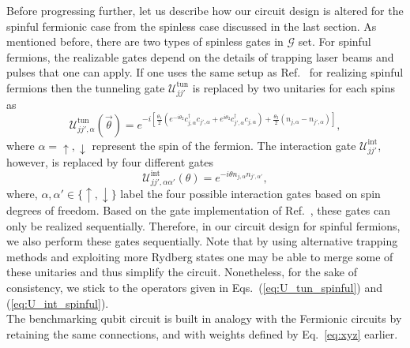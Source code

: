 \documentclass[aps, prx, reprint, superscriptaddress]{revtex4-2}
\begin{document}
Before progressing further, let us describe how our circuit design is altered for the spinful fermionic case from the spinless case discussed in the last section. As mentioned before, there are two types of spinless gates in $\mathcal{G}$ set. For spinful fermions, the realizable gates depend on the details of trapping laser beams and pulses that one can apply. If one uses the same setup as Ref.~\cite{gonzalez2023fermionic} for realizing spinful fermions then the tunneling gate $\mathcal{U}_{jj'}^{\text{tun}}$ is replaced by two unitaries for each spins as
\begin{equation} \label{eq:U_tun_spinful}
\mathcal{U}_{jj',\alpha}^{\text{tun}}(\vec{\theta}) = e^{-i \left[ \frac{\theta_1}{2}\left( e^{-i\theta_2} c_{j,\alpha}^{\dagger} c_{j',\alpha}+ e^{i\theta_2} c_{j',\alpha}^{\dagger} c_{j,\alpha} \right) + \frac{\theta_3}{2} (n_{j,\alpha} - n_{j',\alpha}) \right]},
\end{equation}
where $\alpha{=}\uparrow{,} \downarrow$ represent the spin of the fermion. The interaction gate $\mathcal{U}_{jj'}^{\text{int}}$, however, is replaced by four different gates
\begin{equation} \label{eq:U_int_spinful}
\mathcal{U}_{jj',\alpha\alpha'}^{\text{int}}(\theta)=e^{-i\theta n_{j,\alpha}n_{j',\alpha'}},
\end{equation}
\noindent where, $\alpha,\alpha' \in \{\uparrow,\downarrow\}$ label the four possible interaction gates based on spin degrees of freedom. Based on the gate implementation of Ref.~\cite{gonzalez2023fermionic}, these gates can only be realized sequentially. Therefore, in our circuit design for spinful fermions, we also perform these gates sequentially. Note that by using alternative trapping methods and exploiting more Rydberg states one may be able to merge some of these unitaries and thus simplify the circuit. Nonetheless, for the sake of consistency, we stick to the operators given in Eqs.~(\ref{eq:U_tun_spinful}) and (\ref{eq:U_int_spinful}). 
\\
\noindent The benchmarking qubit circuit is built in analogy with the Fermionic circuits by retaining the same connections, and with weights defined by Eq.~\eqref{eq:xyz} earlier. 
\end{document}
